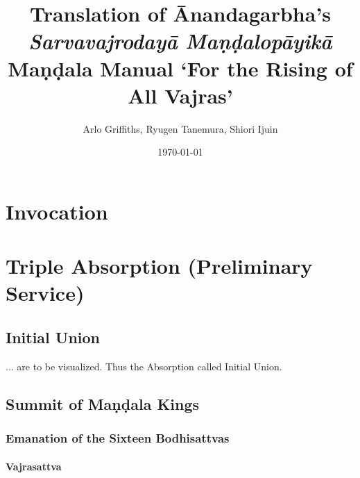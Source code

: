 \documentclass[11pt]{book}
\title{Translation of Ānandagarbha's \emph{Sarvavajrodayā Maṇḍalopāyikā}\\
Maṇḍala Manual `For the Rising of All Vajras'}
\author{Arlo Griffiths, Ryugen Tanemura, Shiori Ijuin}
\date{\today}
\begin{document}
\maketitle



\chapter{Invocation}

\chapter{Triple Absorption (Preliminary Service)}

\section{Initial Union}

... are to be visualized. Thus the Absorption called Initial Union.

\section{Summit of Maṇḍala Kings}

\subsection{Emanation of the Sixteen Bodhisattvas}

\subsubsection{Vajrasattva}
\end{document}
